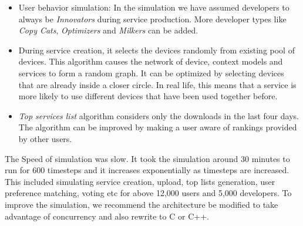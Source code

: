 \begin{itemize}
  \item User behavior simulation: In the simulation we have assumed developers to always be \emph{Innovators} during service production. More developer types like \emph{Copy Cats}, \emph{Optimizers} and \emph{Milkers} can be added.
  \item During service creation, it selects the devices randomly from existing pool of devices. This algorithm causes the network of device, context models and services to form a random graph. It can be optimized by selecting devices that are already inside a closer circle. In real life, this means that a service is more likely to use different devices that have been used together before.
  \item \emph{Top services list} algorithm considers only the downloads in the last four days. The algorithm can be improved by making a user aware of rankings provided by other users.
\end{itemize}


The Speed of simulation was slow. It took the simulation around 30 minutes to run for 600 timesteps and it increases exponentially as timesteps are increased. This included simulating service creation, upload, top lists generation, user preference matching, voting etc for above 12,000 users and 5,000 developers. To improve the simulation, we recommend the architecture be modified to take advantage of concurrency and also rewrite to C or C++.